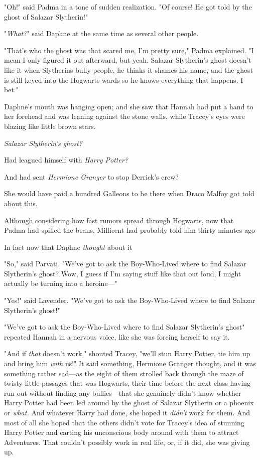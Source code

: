 "Oh!" said Padma in a tone of sudden realization. "Of course! He got told by
the ghost of Salazar Slytherin!"

"\emph{What?}" said Daphne at the same time as several other people.

"That's who the ghost was that scared me, I'm pretty sure," Padma explained. "I
mean I only figured it out afterward, but{\el} yeah. Salazar Slytherin's
ghost doesn't like it when Slytherins bully people, he thinks it shames his
name, and the ghost is still keyed into the Hogwarts wards so he knows
everything that happens, I bet."

Daphne's mouth was hanging open; and she saw that Hannah had put a hand to her
forehead and was leaning against the stone walls, while Tracey's eyes were
blazing like little brown stars.

\emph{Salazar Slytherin's ghost?}

Had leagued himself with \emph{Harry Potter?}

And had sent \emph{Hermione Granger} to stop Derrick's crew?

She would have paid a hundred Galleons to be there when Draco Malfoy got told
about this.

Although considering how fast rumors spread through Hogwarts, now that Padma
had spilled the beans, Millicent had probably told him thirty minutes
ago{\el}

In fact{\el} now that Daphne \emph{thought} about it{\el}

"So," said Parvati. "We've got to ask the Boy-Who-Lived where to find Salazar
Slytherin's ghost? Wow, I guess if I'm saying stuff like that out loud, I might
actually be turning into a heroine—"

"Yes!" said Lavender. "We've got to ask the Boy-Who-Lived where to find Salazar
Slytherin's ghost!"

"We've got to ask{\el} the Boy-Who-Lived{\el} where to find Salazar
Slytherin's ghost{\el}" repeated Hannah in a nervous voice, like she was
forcing herself to say it.

"And if \emph{that} doesn't work," shouted Tracey, "we'll stun Harry Potter,
tie him up and bring him \emph{with} us!"
\sbreak
It said something, Hermione Granger thought, and it was something rather
sad—as the eight of them strolled back through the maze of twisty little
passages that was Hogwarts, their time before the next class having run out
without finding any bullies—that she genuinely didn't know whether Harry
Potter had been led around by the ghost of Salazar Slytherin or a phoenix or
\emph{what.} And whatever Harry had done, she hoped it \emph{didn't} work for
them. And most of all she hoped that the others didn't vote for Tracey's idea
of stunning Harry Potter and carting his unconscious body around with them to
attract Adventures. That couldn't possibly work in real life, or, if it did,
she was giving up.

